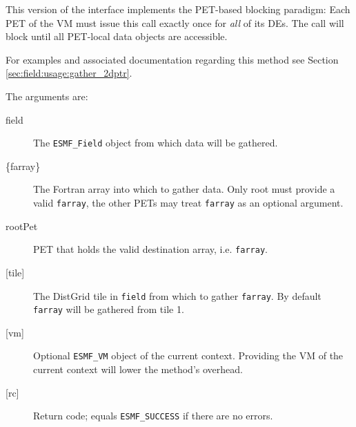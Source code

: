    This version of the interface implements the PET-based blocking paradigm: 
   Each PET of the VM must issue this call exactly once for {\em all} of its 
   DEs. The call will block until all PET-local data objects are accessible. 
   
   For examples and associated documentation regarding this method see Section 
   \ref{sec:field:usage:gather_2dptr}. 
   
   The arguments are: 
   \begin{description} 
   \item[field] 
   The {\tt ESMF\_Field} object from which data will be gathered. 
   \item[\{farray\}] 
   The Fortran array into which to gather data. Only root 
   must provide a valid {\tt farray}, the other PETs may treat 
   {\tt farray} as an optional argument. 
   \item[rootPet] 
   PET that holds the valid destination array, i.e. {\tt farray}. 
   \item[{[tile]}] 
   The DistGrid tile in {\tt field} from which to gather {\tt farray}. 
   By default {\tt farray} will be gathered from tile 1. 
   \item[{[vm]}] 
   Optional {\tt ESMF\_VM} object of the current context. Providing the 
   VM of the current context will lower the method's overhead. 
   \item[{[rc]}] 
   Return code; equals {\tt ESMF\_SUCCESS} if there are no errors. 
   \end{description} 
   
\setlength{\parskip}{\oldparskip}
\setlength{\parindent}{\oldparindent}
\setlength{\baselineskip}{\oldbaselineskip}
